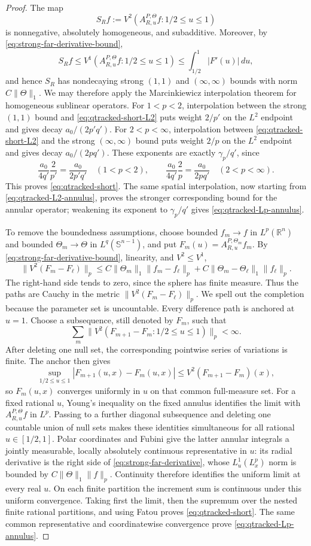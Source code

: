 \documentclass[11pt]{article}
\numberwithin{equation}{section}
\theoremstyle{remark}
\theoremstyle{definition}
\newcommand{\R}{\mathbb R}
\newcommand{\Sph}{\mathbb S}
\newcommand{\norm}[1]{\lVert #1\rVert}
\begin{document}
\begin{proof}
The map
\[
 S_Rf:=V^2(A^{P,\Theta}_{R,u}f:1/2\le u\le1)
\]
is nonnegative, absolutely homogeneous, and subadditive.  Moreover, by
\eqref{eq:strong-far-derivative-bound},
\[
 S_Rf\leq V^1(A^{P,\Theta}_{R,u}f:1/2\le u\le1)
 \leq\int_{1/2}^1|F'(u)|\,du,
\]
and hence $S_R$ has nondecaying strong $(1,1)$ and $(\infty,\infty)$
bounds with norm $C\norm\Theta_1$.  We may therefore
apply the Marcinkiewicz interpolation theorem for homogeneous sublinear
operators.  For $1<p<2$, interpolation between the strong $(1,1)$ bound
and \eqref{eq:qtracked-short-L2} puts weight $2/p'$ on the $L^2$
endpoint and gives decay $a_0/(2p'q')$.  For $2<p<\infty$,
interpolation between \eqref{eq:qtracked-short-L2} and the strong
$(\infty,\infty)$ bound puts weight $2/p$ on the $L^2$ endpoint and gives
decay $a_0/(2pq')$.  These exponents are exactly
$\gamma_p/q'$, since
\[
 \frac{a_0}{4q'}\frac{2}{p'}
 =\frac{a_0}{2p'q'}\quad(1<p<2),
 \qquad
 \frac{a_0}{4q'}\frac{2}{p}
 =\frac{a_0}{2pq'}\quad(2<p<\infty).
\]
This proves \eqref{eq:qtracked-short}.  The same spatial
interpolation, now starting from
\eqref{eq:qtracked-L2-annulus}, proves the stronger corresponding bound
for the annular operator; weakening its exponent to $\gamma_p/q'$ gives
\eqref{eq:qtracked-Lp-annulus}.

To remove the boundedness assumptions, choose bounded $f_m\to f$ in
$L^p(\R^n)$ and bounded $\Theta_m\to\Theta$ in
$L^q(\Sph^{n-1})$, and put
$F_m(u)=A^{P,\Theta_m}_{R,u}f_m$.  By
\eqref{eq:strong-far-derivative-bound}, linearity, and $V^2\le V^1$,
\[
 \norm{V^2(F_m-F_\ell)}_p
 \le C\norm{\Theta_m}_1\norm{f_m-f_\ell}_p
 +C\norm{\Theta_m-\Theta_\ell}_1\norm{f_\ell}_p.
\]
The right-hand side tends to zero, since the sphere has finite measure.
Thus the paths are Cauchy in the metric
$\norm{V^2(F_m-F_\ell)}_p$.  We spell out the completion because the
parameter set is uncountable.  Every difference path is anchored at
$u=1$.  Choose a subsequence, still denoted by $F_m$, such that
\[
 \sum_m\norm{V^2(F_{m+1}-F_m:1/2\le u\le1)}_p<\infty.
\]
After deleting one null set, the corresponding pointwise series of
variations is finite.  The anchor then gives
\[
 \sup_{1/2\le u\le1}|F_{m+1}(u,x)-F_m(u,x)|
 \le V^2(F_{m+1}-F_m)(x),
\]
so $F_m(u,x)$ converges uniformly in $u$ on that common full-measure set.
For a fixed rational $u$, Young's inequality on the fixed annulus
identifies the limit with $A^{P,\Theta}_{R,u}f$ in $L^p$.  Passing to a
further diagonal subsequence and deleting one countable union of null
sets makes these identities simultaneous for all
rational $u\in[1/2,1]$.  Polar coordinates and Fubini give the latter
annular integrals a jointly measurable, locally absolutely continuous
representative in $u$: its radial derivative is the right side of
\eqref{eq:strong-far-derivative}, whose $L^1_u(L^p_x)$ norm is bounded by
$C\norm\Theta_1\norm f_p$.  Continuity therefore identifies the uniform
limit at every real $u$.  On each finite partition the increment sum is
continuous under this uniform convergence.  Taking first the limit, then
the supremum over the nested finite rational partitions, and using Fatou
proves \eqref{eq:qtracked-short}.  The same common representative and
coordinatewise convergence prove \eqref{eq:qtracked-Lp-annulus}.
\end{proof}
\end{document}
